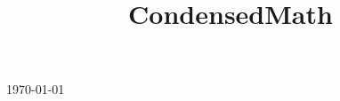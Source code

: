 

\title{CondensedMath}

\usepackage[sort=standard]{glossaries} 
\makeglossaries



\maketitle
\centerline{\today}
\tableofcontents







